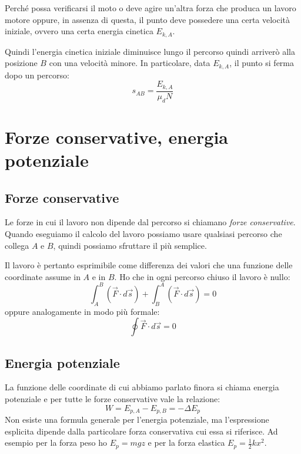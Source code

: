 \documentclass[class=book, crop=false, oneside, 12pt]{standalone}
\begin{document}
Perché possa verificarsi il moto o deve agire un'altra forza che produca un lavoro motore oppure, in assenza di questa, il punto deve possedere una certa velocità iniziale, ovvero una certa energia cinetica \(E_{k,A}\).

Quindi l'energia cinetica iniziale diminuisce lungo il percorso quindi arriverò alla posizione \(B\) con una velocità minore.\newline
In particolare, data \(E_{k,A}\), il punto si ferma dopo un percorso:
\begin{equation*}
    s_{AB} = \frac{E_{k,A}}{\mu_d N}
\end{equation*} 

\section{Forze conservative, energia potenziale}

\subsection{Forze conservative}

Le forze in cui il lavoro non dipende dal percorso si chiamano \emph{forze conservative}.
Quando eseguiamo il calcolo del lavoro possiamo usare qualsiasi percorso che collega \(A\) e \(B\), quindi possiamo sfruttare il più semplice.

Il lavoro è pertanto esprimibile come differenza dei valori che una funzione delle coordinate assume in \(A\) e in \(B\).
Ho che in ogni percorso chiuso il lavoro è nullo:
\begin{equation}
    \int_A^B (\overrightarrow{F} \cdot d \overrightarrow{s}) + \int_B^A (\overrightarrow{F} \cdot d \overrightarrow{s}) = 0
\end{equation}
oppure analogamente in modo più formale:
\begin{equation}
    \oint \overrightarrow{F} \cdot d \overrightarrow{s} = 0
\end{equation}

\subsection{Energia potenziale}

La funzione delle coordinate di cui abbiamo parlato finora si chiama energia potenziale e per tutte le forze conservative vale la relazione:
\begin{equation}
    W = E_{p,A} - E_{p,B} = - \Delta E_p
\end{equation}
Non esiste una formula generale per l'energia potenziale, ma l'espressione esplicita dipende dalla particolare forza conservativa cui essa si riferisce.
Ad esempio per la forza peso ho \(E_p = mgz\) e per la forza elastica \(E_p = \frac{1}{2} k x^2\).
\end{document}
